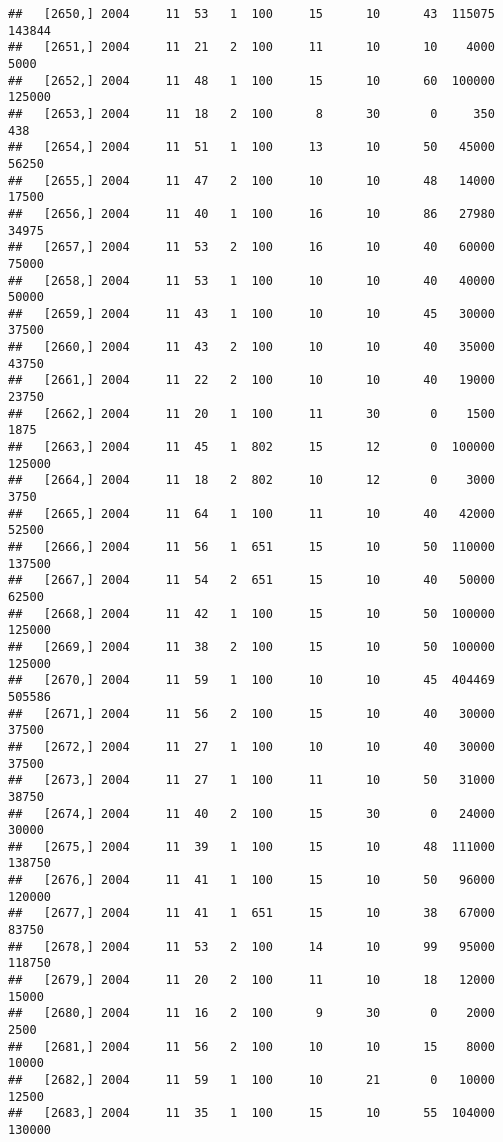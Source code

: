 \documentclass{article}\usepackage[]{graphicx}\usepackage[]{color}
\makeatletter
\newenvironment{kframe}{%
 \def\at@end@of@kframe{}%
 \ifinner\ifhmode%
  \def\at@end@of@kframe{\end{minipage}}%
  \begin{minipage}{\columnwidth}%
 \fi\fi%
 \def\FrameCommand##1{\hskip\@totalleftmargin \hskip-\fboxsep
 \colorbox{shadecolor}{##1}\hskip-\fboxsep
     \hskip-\linewidth \hskip-\@totalleftmargin \hskip\columnwidth}%
 \MakeFramed {\advance\hsize-\width
   \@totalleftmargin\z@ \linewidth\hsize
   \@setminipage}}%
 {\par\unskip\endMakeFramed%
 \at@end@of@kframe}
\newenvironment{knitrout}{}{} %
\makeatother
\begin{document}
\begin{knitrout}
\begin{kframe}
\begin{verbatim}
##   [2650,] 2004     11  53   1  100     15      10      43  115075  143844
##   [2651,] 2004     11  21   2  100     11      10      10    4000    5000
##   [2652,] 2004     11  48   1  100     15      10      60  100000  125000
##   [2653,] 2004     11  18   2  100      8      30       0     350     438
##   [2654,] 2004     11  51   1  100     13      10      50   45000   56250
##   [2655,] 2004     11  47   2  100     10      10      48   14000   17500
##   [2656,] 2004     11  40   1  100     16      10      86   27980   34975
##   [2657,] 2004     11  53   2  100     16      10      40   60000   75000
##   [2658,] 2004     11  53   1  100     10      10      40   40000   50000
##   [2659,] 2004     11  43   1  100     10      10      45   30000   37500
##   [2660,] 2004     11  43   2  100     10      10      40   35000   43750
##   [2661,] 2004     11  22   2  100     10      10      40   19000   23750
##   [2662,] 2004     11  20   1  100     11      30       0    1500    1875
##   [2663,] 2004     11  45   1  802     15      12       0  100000  125000
##   [2664,] 2004     11  18   2  802     10      12       0    3000    3750
##   [2665,] 2004     11  64   1  100     11      10      40   42000   52500
##   [2666,] 2004     11  56   1  651     15      10      50  110000  137500
##   [2667,] 2004     11  54   2  651     15      10      40   50000   62500
##   [2668,] 2004     11  42   1  100     15      10      50  100000  125000
##   [2669,] 2004     11  38   2  100     15      10      50  100000  125000
##   [2670,] 2004     11  59   1  100     10      10      45  404469  505586
##   [2671,] 2004     11  56   2  100     15      10      40   30000   37500
##   [2672,] 2004     11  27   1  100     10      10      40   30000   37500
##   [2673,] 2004     11  27   1  100     11      10      50   31000   38750
##   [2674,] 2004     11  40   2  100     15      30       0   24000   30000
##   [2675,] 2004     11  39   1  100     15      10      48  111000  138750
##   [2676,] 2004     11  41   1  100     15      10      50   96000  120000
##   [2677,] 2004     11  41   1  651     15      10      38   67000   83750
##   [2678,] 2004     11  53   2  100     14      10      99   95000  118750
##   [2679,] 2004     11  20   2  100     11      10      18   12000   15000
##   [2680,] 2004     11  16   2  100      9      30       0    2000    2500
##   [2681,] 2004     11  56   2  100     10      10      15    8000   10000
##   [2682,] 2004     11  59   1  100     10      21       0   10000   12500
##   [2683,] 2004     11  35   1  100     15      10      55  104000  130000

\end{verbatim}
\end{kframe}
\end{knitrout}
\end{document}
